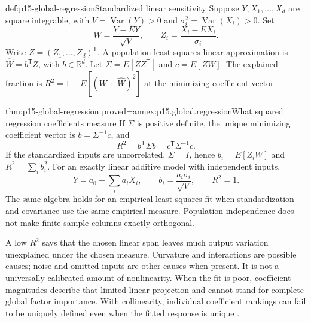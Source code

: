 \begin{hbdefinition}{def:p15-global-regression}{Standardized linear sensitivity}
Suppose \(Y,X_1,\ldots,X_d\) are square integrable, with
\(V=\operatorname{Var}(Y)>0\) and
\(\sigma_i^2=\operatorname{Var}(X_i)>0\).
Set
\[
 W=\frac{Y-EY}{\sqrt V},\qquad
 Z_i=\frac{X_i-EX_i}{\sigma_i}.
\]
Write \(Z=(Z_1,\ldots,Z_d)^\mathsf T\).
A population least-squares linear approximation is
\(\widehat W=b^\mathsf T Z\), with \(b\in\mathbb R^d\).
Let \(\Sigma=E[ZZ^\mathsf T]\) and \(c=E[ZW]\).
The explained fraction is
\(R^2=1-E[(W-\widehat W)^2]\) at the minimizing coefficient vector.
\end{hbdefinition}

\begin{hbtheorem}{thm:p15-global-regression}
 {proved=annex:p15.global.regression}{What squared regression coefficients measure}
If \(\Sigma\) is positive definite, the unique minimizing coefficient
vector is \(b=\Sigma^{-1}c\), and
\[
 R^2=b^\mathsf T\Sigma b=c^\mathsf T\Sigma^{-1}c.
\]
If the standardized inputs are uncorrelated, \(\Sigma=I\), hence
\(b_i=E[Z_iW]\) and \(R^2=\sum_i b_i^2\).
For an exactly linear additive model with independent inputs,
\[
 Y=a_0+\sum_i a_iX_i,\qquad
 b_i=\frac{a_i\sigma_i}{\sqrt V},\qquad R^2=1.
\]
The same algebra holds for an empirical least-squares fit when
standardization and covariance use the same empirical measure.
Population independence does not make finite sample columns exactly
orthogonal.
\end{hbtheorem}

A low \(R^2\) says that the chosen linear span leaves much output variation
unexplained under the chosen measure. Curvature and interactions are
possible causes; noise and omitted inputs are other causes when present.
It is not a universally calibrated amount of nonlinearity.
When the fit is poor, coefficient magnitudes describe that limited
linear projection and cannot stand for complete global factor importance.
With collinearity, individual coefficient rankings can fail to be uniquely
defined even when the fitted response is unique
\cite[Section 5.2]{SaltelliAnnoni2010Sensitivity}.

